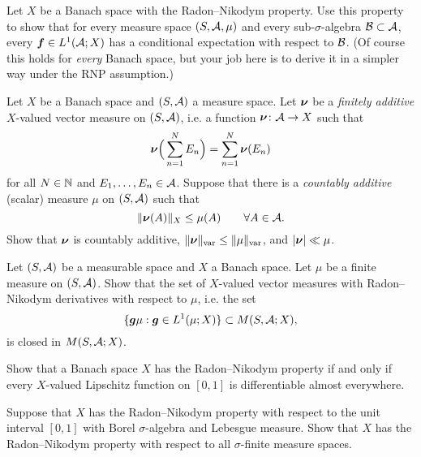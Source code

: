 \begin{exercise}
  Let $X$ be a Banach space with the Radon--Nikodym property.
  Use this property to show that for every measure space $(S,\mathcal{A},\mu)$ and every sub-$\sigma$-algebra $\mathcal{B} \subset \mathcal{A}$, every $\bm{f} \in L^1(\mathcal{A};X)$ has a conditional expectation with respect to $\mathcal{B}$.
  (Of course this holds for \emph{every} Banach space, but your job here is to derive it in a simpler way under the RNP assumption.)
\end{exercise}

\begin{exercise}\label{ex:fa-meas-ca}
  Let $X$ be a Banach space and $(S,\mathcal{A})$ a measure space.
  Let $\bm{\nu}$ be a \emph{finitely additive} $X$-valued vector measure on $(S,\mathcal{A})$, i.e. a function $\bm{\nu} \colon \mathcal{A} \rightarrow X$ such that
  \begin{equation*}
    \bm{\nu}\Big(\sum_{n=1}^{N} E_n\Big) = \sum_{n=1}^{N} \bm{\nu}(E_n)
  \end{equation*}
  for all $N \in \mathbb{N}$ and $E_1,\ldots,E_n \in \mathcal{A}$.
  Suppose that there is a \emph{countably additive} (scalar) measure $\mu$ on $(S,\mathcal{A})$ such that
  \begin{equation*}
    \|\bm{\nu}(A)\|_{X} \leq \mu(A) \qquad \forall A \in \mathcal{A}.
  \end{equation*}
  Show that $\bm{\nu}$ is countably additive, $\|\bm{\nu}\|_{\mathrm{var}} \leq \|\mu\|_{\mathrm{var}}$, and $|\bm{\nu}| \ll \mu$.
\end{exercise}

\begin{exercise}\label{ex:closure-M}
  Let $(S,\mathcal{A})$ be a measurable space and $X$ a Banach space.
  Let $\mu$ be a finite measure on $(S,\mathcal{A})$.
  Show that the set of $X$-valued vector measures with Radon--Nikodym derivatives with respect to $\mu$, i.e. the set
  \begin{equation*}
    \{\bm{g}\mu : \bm{g} \in L^1(\mu;X)\} \subset M(S,\mathcal{A};X),
  \end{equation*}
  is closed in $M(S,\mathcal{A};X)$.
\end{exercise}

\begin{exercise}
  Show that a Banach space $X$ has the Radon--Nikodym property if and only if every $X$-valued Lipschitz function on $[0,1]$ is differentiable almost everywhere.
\end{exercise}

\begin{exercise}\label{ex:RNP-unitinterval}
  Suppose that $X$ has the Radon--Nikodym property with respect to the unit interval $[0,1]$ with Borel $\sigma$-algebra and Lebesgue measure.
  Show that $X$ has the Radon--Nikodym property with respect to all $\sigma$-finite measure spaces.
\end{exercise}




